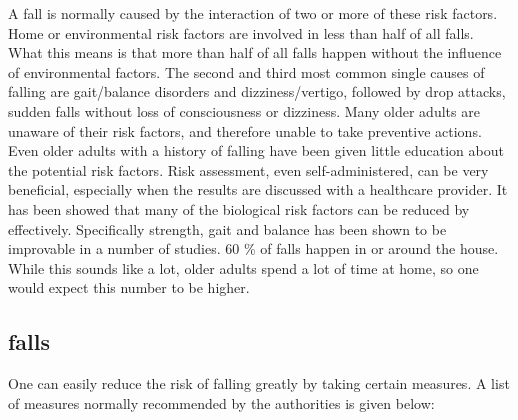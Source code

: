 A fall is normally caused by the interaction of two or more of these risk factors. Home or environmental risk factors are involved in less than half of all falls. What this means is that more than half of all falls happen without the influence of environmental factors. The second and third most common single causes of falling are gait/balance disorders and dizziness/vertigo, followed by drop attacks, sudden falls without loss of consciousness or dizziness.
	Many older adults are unaware of their risk factors, and therefore unable to take preventive actions. Even older adults with a history of falling have been given little education about the potential risk factors. Risk assessment, even self-administered, can be very beneficial, especially when the results are discussed with a healthcare provider.
	It has been showed that many of the biological risk factors can be reduced by effectively. Specifically strength, gait and balance has been shown to be improvable in a number of studies.
60 \% of falls happen in or around the house. While this sounds like a lot, older adults spend a lot of time at home, so one would expect this number to be higher.

\subsection{falls}

One can easily reduce the risk of falling greatly by taking certain measures. A list of measures normally recommended by the authorities is given below:

